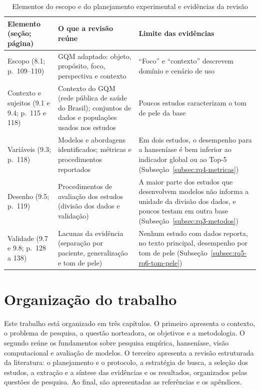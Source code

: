 \begin{table}[htb]
\centering
\caption{Elementos do escopo e do planejamento experimental e evidências da revisão}
\label{tab:planejamento-wohlin}
\footnotesize
\begin{tabular}{>{\raggedright\arraybackslash}p{3.6cm} >{\raggedright\arraybackslash}p{4.3cm} >{\raggedright\arraybackslash}p{6.5cm}}
\toprule
\textbf{Elemento (seção; página)} & \textbf{O que a revisão reúne} & \textbf{Limite das evidências} \\
\midrule
Escopo (8.1; p.~109--110) & GQM adaptado: objeto, propósito, foco, perspectiva e contexto & ``Foco'' e ``contexto'' descrevem domínio e cenário de uso \\
Contexto e sujeitos (9.1 e 9.4; p.~115 e 118) & Contexto do GQM (rede pública de saúde do Brasil); conjuntos de dados e populações usados nos estudos & Poucos estudos caracterizam o tom de pele da base \\
Variáveis (9.3; p.~118) & Modelos e abordagens identificados; métricas e procedimentos reportados & Em dois estudos, o desempenho para a hanseníase é bem inferior ao indicador global ou ao Top-5 (Subseção~\ref{subsec:rq4-metricas}) \\
Desenho (9.5; p.~119) & Procedimentos de avaliação dos estudos (divisão dos dados e validação) & A maior parte dos estudos que desenvolvem modelos não informa a unidade da divisão dos dados, e poucos testam em outra base (Subseção~\ref{subsec:rq3-metodos}) \\
Validade (9.7 e 9.8; p.~128 a 138) & Lacunas da evidência (separação por paciente, generalização e tom de pele) & Nenhum estudo com dados reporta, no texto principal, desempenho por tom de pele (Subseção~\ref{subsec:rq5-rq6-tom-pele}) \\
\bottomrule
\end{tabular}
\end{table}

\section{Organização do trabalho}

Este trabalho está organizado em três capítulos. O primeiro apresenta o
contexto, o problema de pesquisa, a questão norteadora, os objetivos e a
metodologia. O segundo reúne os fundamentos sobre pesquisa empírica,
hanseníase, visão computacional e avaliação de modelos. O terceiro apresenta a
revisão estruturada da literatura: o planejamento e o protocolo, a estratégia
de busca, a seleção dos estudos, a extração e a síntese das evidências e os
resultados, organizados pelas questões de pesquisa. Ao final, são apresentadas
as referências e os apêndices.

